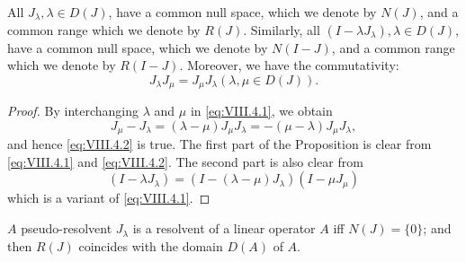 \begin{propositionu} All $J_{\lambda}, \lambda \in D(J)$, have a common null space, which we denote by $N(J)$, and a common range which we denote by $R(J)$. Similarly, all $(I - \lambda J_{\lambda}), \lambda \in D(J)$, have a common null space, which we denote by $N(I - J)$, and a common range which we denote by $R(I - J)$. Moreover, we have the commutativity: 
\begin{equation}\label{eq:VIII.4.2}
J _{\lambda} J _{\mu} = J _{\mu} J _{\lambda} (\lambda , \mu \in D (J)).
\end{equation}
\end{propositionu}

\begin{proof}
 By interchanging $\lambda$ and $\mu$ in \eqref{eq:VIII.4.1}, we obtain 
\[
J _{\mu} - J _{\lambda} = (\lambda - \mu) J _{\mu} J _{\lambda} = - (\mu - \lambda) J _{\mu} J _{\lambda},
\]
and hence \eqref{eq:VIII.4.2} is true. The first part of the Proposition is clear from \eqref{eq:VIII.4.1} and \eqref{eq:VIII.4.2}. The second part is also clear from 
\begin{equation}\tag{1'}\label{eq:VIII.4.1'}
(I - \lambda J _{\lambda}) = (I - (\lambda - \mu) J _{\lambda}) (I - \mu J _{\mu})
\end{equation}
which is a variant of \eqref{eq:VIII.4.1}. 
\end{proof}

\begin{theorem}\label{thm:VIII.4.Theorem.1} $A$ pseudo-resolvent $J_{\lambda}$ is a resolvent of a linear operator $A$ iff $N(J) = \{0\}$; and then $R(J)$ coincides with the domain $D(A)$ of $A$. 
\end{theorem}

